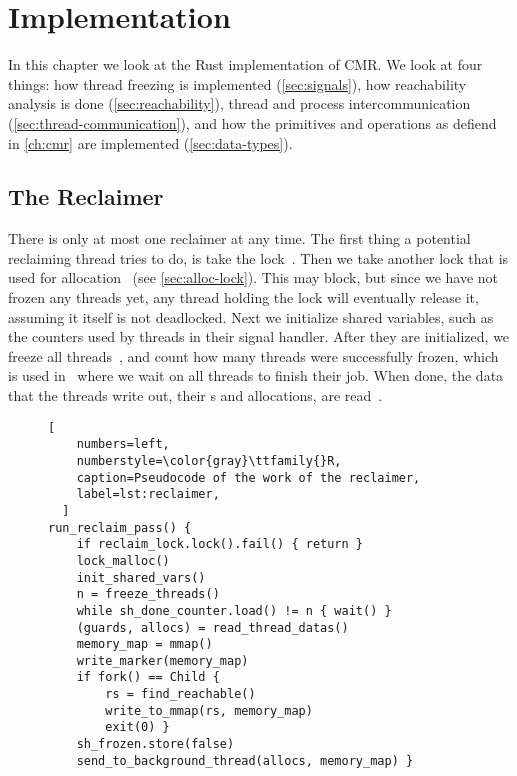 \chapter{Implementation}

In this chapter we look at the Rust implementation of CMR\@.  We look at four things: how thread
freezing is implemented (\cref{sec:signals}), how reachability analysis is done
(\cref{sec:reachability}), thread and process intercommunication
(\cref{sec:thread-communication}), and how the primitives and operations as defiend in
\cref{ch:cmr} are implemented (\cref{sec:data-types}).


\section{The Reclaimer\label{sec:thread-communication}}

There is only at most one reclaimer at any time. The first thing a potential reclaiming thread
tries to do, is take the lock~. Then we take another lock that is used for
allocation~ (see \cref{sec:alloc-lock}). This may block, but since we have not
frozen any threads yet, any thread holding the lock will eventually release it, assuming it itself
is not deadlocked. Next we initialize shared variables, such as the counters used by threads in
their signal handler. After they are initialized, we freeze all threads~, and count how
many threads were successfully frozen, which is used in~ where we wait on all threads
to finish their job. When done, the data that the threads write out, their s and
allocations, are read~.

\begin{figure}[ht]
  \begin{lstlisting}[
    numbers=left,
    numberstyle=\color{gray}\ttfamily{}R,
    caption=Pseudocode of the work of the reclaimer,
    label=lst:reclaimer,
  ]
run_reclaim_pass() {
    if reclaim_lock.lock().fail() { return }
    lock_malloc()
    init_shared_vars()
    n = freeze_threads()
    while sh_done_counter.load() != n { wait() }
    (guards, allocs) = read_thread_datas()
    memory_map = mmap()
    write_marker(memory_map)
    if fork() == Child {
        rs = find_reachable()
        write_to_mmap(rs, memory_map)
        exit(0) }
    sh_frozen.store(false)
    send_to_background_thread(allocs, memory_map) }\end{lstlisting}
\end{figure}

